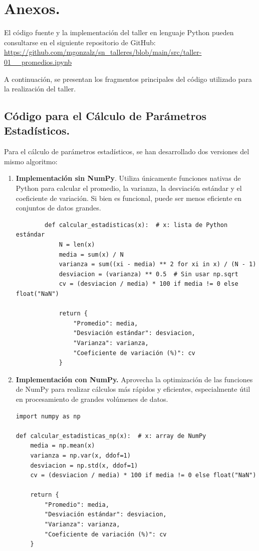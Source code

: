 \documentclass{article}
\begin{document}
\newpage
\section{Anexos.}
El código fuente y la implementación del taller en lenguaje Python pueden consultarse en el siguiente repositorio de GitHub: \noindent\url{https://github.com/mgonzalz/sn_talleres/blob/main/src/taller-01__promedios.ipynb}

\noindent A continuación, se presentan los fragmentos principales del código utilizado para la realización del taller.

\subsection{Código para el Cálculo de Parámetros Estadísticos.}
\noindent Para el cálculo de parámetros estadísticos, se han desarrollado dos versiones del mismo algoritmo:  

\begin{enumerate}
    \item \textbf{Implementación sin NumPy}. Utiliza únicamente funciones nativas de Python para calcular el promedio, la varianza, la desviación estándar y el coeficiente de variación. Si bien es funcional, puede ser menos eficiente en conjuntos de datos grandes.
        \begin{verbatim}
        def calcular_estadisticas(x):  # x: lista de Python estándar
            N = len(x)
            media = sum(x) / N
            varianza = sum((xi - media) ** 2 for xi in x) / (N - 1)
            desviacion = (varianza) ** 0.5  # Sin usar np.sqrt
            cv = (desviacion / media) * 100 if media != 0 else float("NaN")
        
            return {
                "Promedio": media,
                "Desviación estándar": desviacion,
                "Varianza": varianza,
                "Coeficiente de variación (%)": cv
            }
        \end{verbatim}
    \item \textbf{Implementación con NumPy.} Aprovecha la optimización de las funciones de NumPy para realizar cálculos más rápidos y eficientes, especialmente útil en procesamiento de grandes volúmenes de datos. 
    \begin{verbatim}
import numpy as np

def calcular_estadisticas_np(x):  # x: array de NumPy
    media = np.mean(x)
    varianza = np.var(x, ddof=1)
    desviacion = np.std(x, ddof=1)
    cv = (desviacion / media) * 100 if media != 0 else float("NaN")

    return {
        "Promedio": media,
        "Desviación estándar": desviacion,
        "Varianza": varianza,
        "Coeficiente de variación (%)": cv
    }
\end{verbatim}
\end{enumerate}
\end{document}
